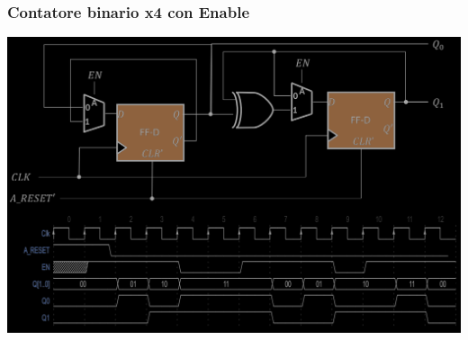 \documentclass{article}
\begin{document}
\subsubsection*{Contatore binario x4 con Enable}
\begin{center}
    \includegraphics[scale=0.35]{contatore x4 en.png}
\end{center}
\end{document}
